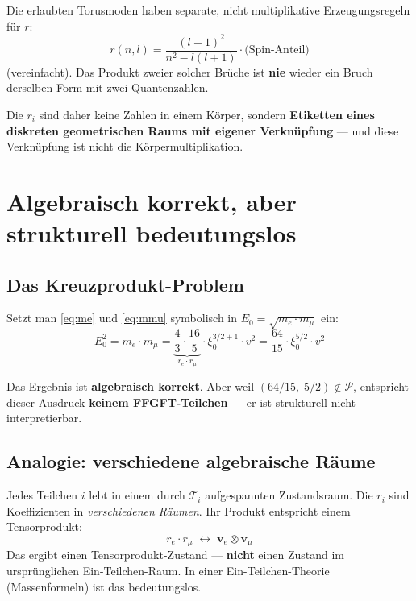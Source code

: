Die erlaubten Torusmoden haben separate, nicht multiplikative
Erzeugungsregeln für $r$:
\[
  r(n,l) = \frac{(l+1)^2}{n^2 - l(l+1)} \cdot \text{(Spin-Anteil)}
\]
(vereinfacht). Das Produkt zweier solcher Brüche ist \textbf{nie}
wieder ein Bruch derselben Form mit zwei Quantenzahlen.

Die $r_i$ sind daher keine Zahlen in einem Körper, sondern
\textbf{Etiketten eines diskreten geometrischen Raums mit eigener
Verknüpfung} --- und diese Verknüpfung ist nicht die Körpermultiplikation.

\section{Algebraisch korrekt, aber strukturell bedeutungslos}

\subsection{Das Kreuzprodukt-Problem}

Setzt man \eqref{eq:me} und \eqref{eq:mmu} symbolisch in
$E_0 = \sqrt{m_e \cdot m_\mu}$ ein:
\begin{equation}
  E_0^2 = m_e \cdot m_\mu
        = \underbrace{\frac{4}{3} \cdot \frac{16}{5}}_{r_e \cdot r_\mu}
          \cdot \xi_0^{3/2 + 1} \cdot v^2
        = \frac{64}{15} \cdot \xi_0^{5/2} \cdot v^2
  \label{eq:kreuz}
\end{equation}

Das Ergebnis ist \textbf{algebraisch korrekt}. Aber weil
$(64/15,\;5/2) \notin \mathcal{P}$, entspricht dieser Ausdruck
\textbf{keinem FFGFT-Teilchen} --- er ist strukturell nicht
interpretierbar.

\subsection{Analogie: verschiedene algebraische Räume}

Jedes Teilchen $i$ lebt in einem durch $\mathcal{T}_i$ aufgespannten
Zustandsraum. Die $r_i$ sind Koeffizienten in \emph{verschiedenen Räumen}.
Ihr Produkt entspricht einem Tensorprodukt:
\[
  r_e \cdot r_\mu \;\leftrightarrow\; \mathbf{v}_e \otimes \mathbf{v}_\mu
\]
Das ergibt einen Tensorprodukt-Zustand --- \textbf{nicht} einen Zustand
im ursprünglichen Ein-Teilchen-Raum. In einer Ein-Teilchen-Theorie
(Massenformeln) ist das bedeutungslos.

